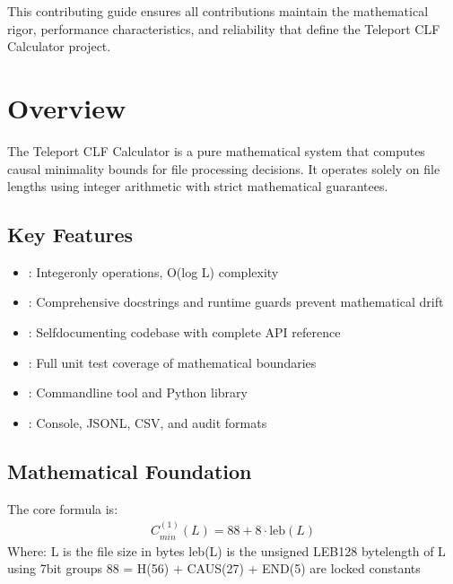 \documentclass[letterpaper,10pt,english]{sphinxmanual}
\begin{document}
\sphinxAtStartPar
This contributing guide ensures all contributions maintain the mathematical rigor, performance characteristics, and reliability that define the Teleport CLF Calculator project.


\chapter{Overview}
\label{\detokenize{index:overview}}
\sphinxAtStartPar
The Teleport CLF Calculator is a pure mathematical system that computes causal minimality bounds for file processing decisions. It operates solely on file lengths using integer arithmetic with strict mathematical guarantees.


\section{Key Features}
\label{\detokenize{index:key-features}}\begin{itemize}
\item {} 
\sphinxAtStartPar
{}: Integer\sphinxhyphen{}only operations, O(log L) complexity

\item {} 
\sphinxAtStartPar
{}: Comprehensive docstrings and runtime guards prevent mathematical drift

\item {} 
\sphinxAtStartPar
{}: Self\sphinxhyphen{}documenting codebase with complete API reference

\item {} 
\sphinxAtStartPar
{}: Full unit test coverage of mathematical boundaries

\item {} 
\sphinxAtStartPar
{}: Command\sphinxhyphen{}line tool and Python library

\item {} 
\sphinxAtStartPar
{}: Console, JSONL, CSV, and audit formats

\end{itemize}


\section{Mathematical Foundation}
\label{\detokenize{index:mathematical-foundation}}
\sphinxAtStartPar
The core formula is:
\begin{equation*}
\begin{split}C_{min}^{(1)}(L) = 88 + 8 \cdot \text{leb}(L)\end{split}
\end{equation*}
\sphinxAtStartPar
Where:
\sphinxhyphen{} L is the file size in bytes
\sphinxhyphen{} leb(L) is the unsigned LEB128 byte\sphinxhyphen{}length of L using 7\sphinxhyphen{}bit groups
\sphinxhyphen{} 88 = H(56) + CAUS(27) + END(5) are locked constants
\end{document}
